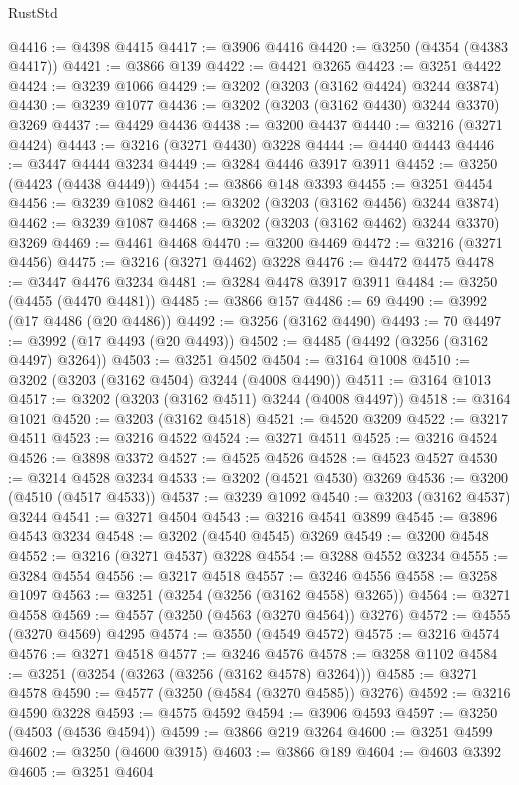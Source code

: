 \begin{lexlean}{RustStd}
\begin{coremodule}
@4416 := @4398 @4415
@4417 := @3906 @4416
@4420 := @3250 (@4354 (@4383 @4417))
@4421 := @3866 @139
@4422 := @4421 @3265
@4423 := @3251 @4422
@4424 := @3239 @1066
@4429 := @3202 (@3203 (@3162 @4424) @3244 @3874)
@4430 := @3239 @1077
@4436 := @3202 (@3203 (@3162 @4430) @3244 @3370) @3269
@4437 := @4429 @4436
@4438 := @3200 @4437
@4440 := @3216 (@3271 @4424)
@4443 := @3216 (@3271 @4430) @3228
@4444 := @4440 @4443
@4446 := @3447 @4444 @3234
@4449 := @3284 @4446 @3917 @3911
@4452 := @3250 (@4423 (@4438 @4449))
@4454 := @3866 @148 @3393
@4455 := @3251 @4454
@4456 := @3239 @1082
@4461 := @3202 (@3203 (@3162 @4456) @3244 @3874)
@4462 := @3239 @1087
@4468 := @3202 (@3203 (@3162 @4462) @3244 @3370) @3269
@4469 := @4461 @4468
@4470 := @3200 @4469
@4472 := @3216 (@3271 @4456)
@4475 := @3216 (@3271 @4462) @3228
@4476 := @4472 @4475
@4478 := @3447 @4476 @3234
@4481 := @3284 @4478 @3917 @3911
@4484 := @3250 (@4455 (@4470 @4481))
@4485 := @3866 @157
@4486 := 69
@4490 := @3992 (@17 @4486 (@20 @4486))
@4492 := @3256 (@3162 @4490)
@4493 := 70
@4497 := @3992 (@17 @4493 (@20 @4493))
@4502 := @4485 (@4492 (@3256 (@3162 @4497) @3264))
@4503 := @3251 @4502
@4504 := @3164 @1008
@4510 := @3202 (@3203 (@3162 @4504) @3244 (@4008 @4490))
@4511 := @3164 @1013
@4517 := @3202 (@3203 (@3162 @4511) @3244 (@4008 @4497))
@4518 := @3164 @1021
@4520 := @3203 (@3162 @4518)
@4521 := @4520 @3209
@4522 := @3217 @4511
@4523 := @3216 @4522
@4524 := @3271 @4511
@4525 := @3216 @4524
@4526 := @3898 @3372
@4527 := @4525 @4526
@4528 := @4523 @4527
@4530 := @3214 @4528 @3234
@4533 := @3202 (@4521 @4530) @3269
@4536 := @3200 (@4510 (@4517 @4533))
@4537 := @3239 @1092
@4540 := @3203 (@3162 @4537) @3244
@4541 := @3271 @4504
@4543 := @3216 @4541 @3899
@4545 := @3896 @4543 @3234
@4548 := @3202 (@4540 @4545) @3269
@4549 := @3200 @4548
@4552 := @3216 (@3271 @4537) @3228
@4554 := @3288 @4552 @3234
@4555 := @3284 @4554
@4556 := @3217 @4518
@4557 := @3246 @4556
@4558 := @3258 @1097
@4563 := @3251 (@3254 (@3256 (@3162 @4558) @3265))
@4564 := @3271 @4558
@4569 := @4557 (@3250 (@4563 (@3270 @4564)) @3276)
@4572 := @4555 (@3270 @4569) @4295
@4574 := @3550 (@4549 @4572)
@4575 := @3216 @4574
@4576 := @3271 @4518
@4577 := @3246 @4576
@4578 := @3258 @1102
@4584 := @3251 (@3254 (@3263 (@3256 (@3162 @4578) @3264)))
@4585 := @3271 @4578
@4590 := @4577 (@3250 (@4584 (@3270 @4585)) @3276)
@4592 := @3216 @4590 @3228
@4593 := @4575 @4592
@4594 := @3906 @4593
@4597 := @3250 (@4503 (@4536 @4594))
@4599 := @3866 @219 @3264
@4600 := @3251 @4599
@4602 := @3250 (@4600 @3915)
@4603 := @3866 @189
@4604 := @4603 @3392
@4605 := @3251 @4604

\end{coremodule}
\end{lexlean}
